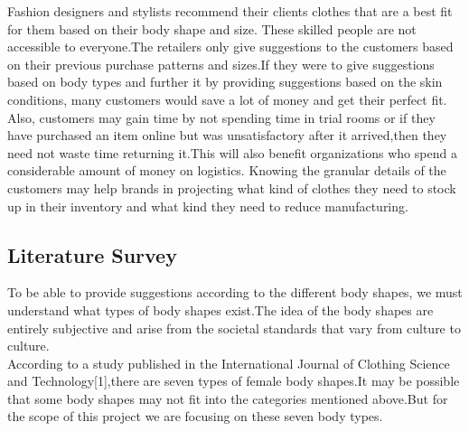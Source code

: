 \documentclass[11pt,journal,compsoc]{IEEEtran}
\begin{document}
% 
% 
% 

\IEEEPARstart Fashion designers and stylists recommend their clients clothes that are a best fit for them based on their body shape and size. These skilled people are not accessible to everyone.The retailers only give suggestions to the customers based on their previous purchase patterns and sizes.If they were to give suggestions based on body types and further it by providing suggestions based on the skin conditions, many customers would save a lot of money and get their perfect fit. Also, customers may gain time by not spending time in trial rooms or if they have purchased an item online but was unsatisfactory after it arrived,then they need not waste time returning it.This will also benefit organizations who spend a considerable amount of money on logistics. Knowing the granular details of the customers may help brands in projecting what kind of clothes they need to stock up in their inventory and what kind they need to reduce manufacturing.
\\
\subsection{Literature Survey}
To be able to provide suggestions according to the different body shapes, we must understand what types of body shapes exist.The idea of the body shapes are entirely subjective and arise from the societal standards that vary from culture to culture. \\
According to a study published in the International Journal of Clothing Science and Technology[1],there are seven types of female body shapes.It may be possible that some body shapes may not fit into the categories mentioned above.But for the scope of this project we are focusing on these seven body types. \\
\end{document}
